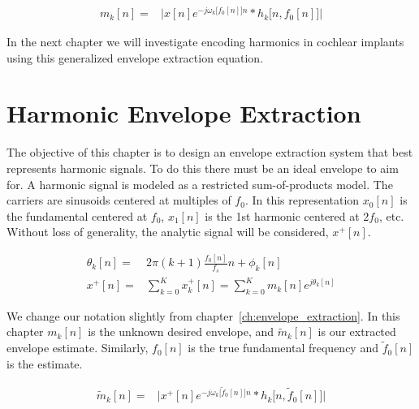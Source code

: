 \documentclass [11pt, proquest,oneside] {ganter_thesis}[2015/03/03]
\begin{document}
\begin{align}
\label{eq:envelope_extraction_general}
m_k[n] =& \Big| x[n]e^{-j \omega_k\big[f_0[n]\big]n} * h_k\big[n,f_0[n]\big]  \Big|
\end{align}

In the next chapter we will investigate encoding harmonics in cochlear implants using this generalized envelope extraction equation.





\chapter{Harmonic Envelope Extraction}\label{ch:harmonic_envelopes}

The objective of this chapter is to design an envelope extraction system that best represents harmonic signals.  To do this there must be an ideal envelope to aim for.  A harmonic signal is modeled as  a restricted sum-of-products model.  The carriers are sinusoids centered at multiples of $f_0$. In this representation $x_0[n]$ is the fundamental centered at $f_0$, $x_1[n]$ is the 1st harmonic centered at $2f_0$, etc.  Without loss of generality, the analytic signal will be considered, $x^+[n]$.

\begin{align}
\theta_k[n] =& 2\pi(k+1)\frac{f_0[n]}{f_s}n + \phi_k[n] \\
\label{eq:harmonic_SOP}
x^+[n] =& \sum\limits_{k=0}^K x_k^+[n] = \sum\limits_{k=0}^K m_k[n] e^{j\theta_k[n]}
\end{align}

We change our notation slightly from chapter~\ref{ch:envelope_extraction}.  In this chapter $m_k[n]$ is the unknown desired envelope, and $\tilde{m}_k[n]$ is our extracted envelope estimate.  Similarly, $f_0[n]$ is the true fundamental frequency and $\tilde{f}_0[n]$ is the estimate.

\begin{align}
\label{eq:envelope_extraction}
\tilde{m}_k[n] =& \Big| x^+[n]e^{-j \omega_k\big[\tilde{f}_0[n]\big]n} * h_k\big[n,\tilde{f}_0[n]\big]  \Big|
\end{align}
\end{document}
